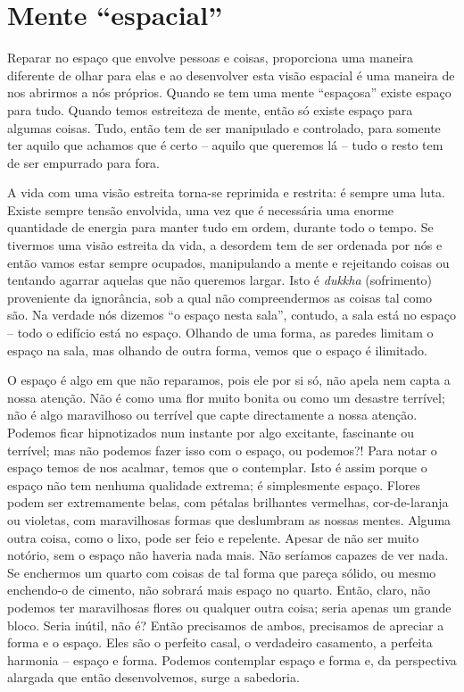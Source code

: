 \section{Mente ``espacial''}

Reparar no espaço que envolve pessoas e coisas, proporciona uma maneira
diferente de olhar para elas e ao desenvolver esta visão espacial é uma
maneira de nos abrirmos a nós próprios. Quando se tem uma mente
``espaçosa'' existe espaço para tudo. Quando temos estreiteza de mente,
então só existe espaço para algumas coisas. Tudo, então tem de ser
manipulado e controlado, para somente ter aquilo que achamos que é certo
-- aquilo que queremos lá -- tudo o resto tem de ser empurrado para
fora.

A vida com uma visão estreita torna-se reprimida e restrita: é sempre
uma luta. Existe sempre tensão envolvida, uma vez que é necessária uma
enorme quantidade de energia para manter tudo em ordem, durante todo o
tempo. Se tivermos uma visão estreita da vida, a desordem tem de ser
ordenada por nós e então vamos estar sempre ocupados, manipulando a
mente e rejeitando coisas ou tentando agarrar aquelas que não queremos
largar. Isto é \emph{dukkha} (sofrimento) proveniente da ignorância, sob
a qual não compreendermos as coisas tal como são. Na verdade nós dizemos
``o espaço nesta sala'', contudo, a sala está no espaço -- todo o
edifício está no espaço. Olhando de uma forma, as paredes limitam o
espaço na sala, mas olhando de outra forma, vemos que o espaço é
ilimitado.

O espaço é algo em que não reparamos, pois ele por si só, não apela nem
capta a nossa atenção. Não é como uma flor muito bonita ou como um
desastre terrível; não é algo maravilhoso ou terrível que capte
directamente a nossa atenção. Podemos ficar hipnotizados num instante
por algo excitante, fascinante ou terrível; mas não podemos fazer isso
com o espaço, ou podemos?! Para notar o espaço temos de nos acalmar,
temos que o contemplar. Isto é assim porque o espaço não tem nenhuma
qualidade extrema; é simplesmente espaço. Flores podem ser extremamente
belas, com pétalas brilhantes vermelhas, cor-de-laranja ou violetas, com
maravilhosas formas que deslumbram as nossas mentes. Alguma outra coisa,
como o lixo, pode ser feio e repelente. Apesar de não ser muito notório,
sem o espaço não haveria nada mais. Não seríamos capazes de ver nada. Se
enchermos um quarto com coisas de tal forma que pareça sólido, ou mesmo
enchendo-o de cimento, não sobrará mais espaço no quarto. Então, claro,
não podemos ter maravilhosas flores ou qualquer outra coisa; seria
apenas um grande bloco. Seria inútil, não é? Então precisamos de ambos,
precisamos de apreciar a forma e o espaço. Eles são o perfeito casal, o
verdadeiro casamento, a perfeita harmonia -- espaço e forma. Podemos
contemplar espaço e forma e, da perspectiva alargada que então
desenvolvemos, surge a sabedoria.

